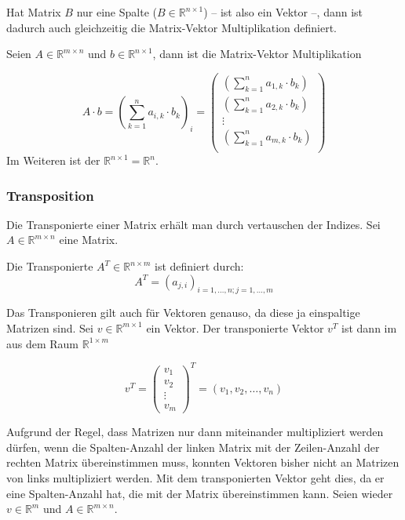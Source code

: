 \begin{svgraybox}
Hat Matrix $B$ nur eine Spalte ($B\in \mathbb{R}^{n\times 1}$) -- ist also ein Vektor --, dann ist dadurch auch gleichzeitig die Matrix-Vektor Multiplikation definiert. 
\end{svgraybox}

Seien $A\in \mathbb{R}^{m\times n}$ und $b\in \mathbb{R}^{n\times 1}$, dann ist die Matrix-Vektor Multiplikation

\begin{equation*}
A \cdot b = \left( \sum_{k=1}^{n} a_{i,k} \cdot b_{k} \right)_{i} = \begin{pmatrix}
\left( \sum_{k=1}^{n} a_{1,k} \cdot b_{k} \right) \\
\left( \sum_{k=1}^{n} a_{2,k} \cdot b_{k} \right) \\
\vdots \\
\left( \sum_{k=1}^{n} a_{m,k} \cdot b_{k} \right) \\
\end{pmatrix}
\end{equation*}
Im Weiteren ist der $\mathbb{R}^{n\times 1} = \mathbb{R}^n$.


\subsubsection{Transposition}

Die Transponierte einer Matrix erhält man durch vertauschen der Indizes. Sei $A \in \mathbb{R}^{m\times n} $ eine Matrix. 

\begin{definition}
Die Transponierte $A^T \in \mathbb{R}^{n\times m}$ ist definiert durch:
\[
	A^T = (a_{j,i})_{i=1,\dots, n; j=1,\dots, m}
\]
\end{definition}
Das Transponieren gilt auch für Vektoren genauso, da diese ja einspaltige Matrizen sind. Sei $v\in \mathbb{R}^{m\times 1}$ ein Vektor. Der transponierte Vektor $v^T$ ist dann im aus dem Raum $\mathbb{R}^{1\times m}$

\[
v^T = \begin{pmatrix}
v_1\\
v_2\\
\vdots \\
v_m
\end{pmatrix}^T = (v_1, v_2, \dots , v_n)
\]

Aufgrund der Regel, dass Matrizen nur dann miteinander multipliziert werden dürfen, wenn die Spalten-Anzahl der linken Matrix mit der Zeilen-Anzahl der rechten Matrix übereinstimmen muss, konnten Vektoren bisher nicht an Matrizen von links multipliziert werden. Mit dem transponierten Vektor geht dies, da er eine Spalten-Anzahl hat, die mit der Matrix übereinstimmen kann. Seien wieder $v\in \mathbb{R}^m$ und $A\in \mathbb{R}^{m\times n}$.

